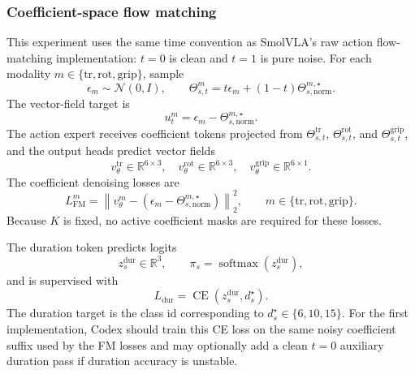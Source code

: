 \documentclass[10pt,twocolumn,letterpaper]{article}
\begin{document}
\subsubsection*{Coefficient-space flow matching}
This experiment uses the same time convention as SmolVLA's raw action flow-matching implementation: $t=0$ is clean and $t=1$ is pure noise. For each modality $m\in\{\mathrm{tr},\mathrm{rot},\mathrm{grip}\}$, sample
\begin{equation}
\epsilon_m\sim\mathcal{N}(0,I),
\qquad
\Theta_{s,t}^m=t\epsilon_m+(1-t)\Theta_{s,\mathrm{norm}}^{m,\star}.
\end{equation}
The vector-field target is
\begin{equation}
u_t^m=\epsilon_m-\Theta_{s,\mathrm{norm}}^{m,\star}.
\end{equation}
The action expert receives coefficient tokens projected from $\Theta_{s,t}^{\mathrm{tr}}$, $\Theta_{s,t}^{\mathrm{rot}}$, and $\Theta_{s,t}^{\mathrm{grip}}$, and the output heads predict vector fields
\begin{equation}
 v_\theta^{\mathrm{tr}}\in\mathbb{R}^{6\times3},
 \quad
 v_\theta^{\mathrm{rot}}\in\mathbb{R}^{6\times3},
 \quad
 v_\theta^{\mathrm{grip}}\in\mathbb{R}^{6\times1}.
\end{equation}
The coefficient denoising losses are
\begin{equation}
L_{\mathrm{FM}}^m=
\left\|v_\theta^m-\left(\epsilon_m-\Theta_{s,\mathrm{norm}}^{m,\star}\right)\right\|_2^2,
\qquad m\in\{\mathrm{tr},\mathrm{rot},\mathrm{grip}\}.
\end{equation}
Because $K$ is fixed, no active coefficient masks are required for these losses.

The duration token predicts logits
\begin{equation}
z_s^{\mathrm{dur}}\in\mathbb{R}^{3},
\qquad
\pi_s=\operatorname{softmax}(z_s^{\mathrm{dur}}),
\end{equation}
and is supervised with
\begin{equation}
L_{\mathrm{dur}}=\operatorname{CE}(z_s^{\mathrm{dur}},d_s^\star).
\end{equation}
The duration target is the class id corresponding to $d_s^\star\in\{6,10,15\}$. For the first implementation, Codex should train this CE loss on the same noisy coefficient suffix used by the FM losses and may optionally add a clean $t=0$ auxiliary duration pass if duration accuracy is unstable.
\end{document}
